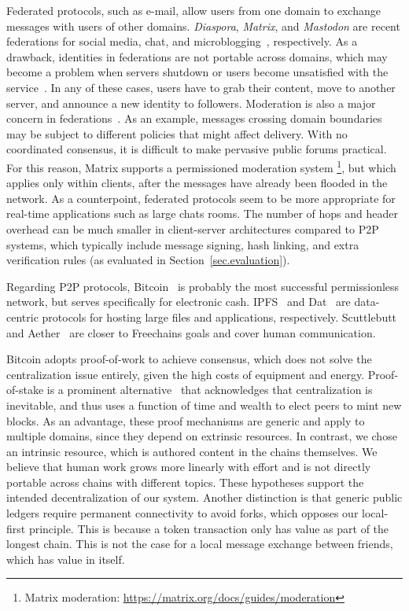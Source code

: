 \documentclass[12pt]{article}
\newcommand{\FC}       {Freechains\xspace}
\begin{document}
Federated protocols, such as e-mail, allow users from one domain to exchange
messages with users of other domains.
\emph{Diaspora}, \emph{Matrix}, and \emph{Mastodon} are recent federations for
social media, chat, and microblogging~\cite{p2p.ecosystem}, respectively.
%
As a drawback, identities in federations are not portable across domains, which
may become a problem when servers shutdown or users become unsatisfied with the
service~\cite{fed.distributed}.
In any of these cases, users have to grab their content, move to another
server, and announce a new identity to followers.
%
Moderation is also a major concern in federations~\cite{p2p.ecosystem}.
As an example, messages crossing domain boundaries may be subject to different
policies that might affect delivery.
With no coordinated consensus, it is difficult to make pervasive public forums
practical.
%
For this reason, Matrix supports a permissioned moderation system%
\footnote{Matrix moderation: \url{https://matrix.org/docs/guides/moderation}},
but which applies only within clients, after the messages have already been
flooded in the network.
%
As a counterpoint, federated protocols seem to be more appropriate for
real-time applications such as large chats rooms.
The number of hops and header overhead can be much smaller in client-server
architectures compared to P2P systems, which typically include message signing,
hash linking, and extra verification rules (as evaluated in
Section~\ref{sec.evaluation}).


Regarding P2P protocols, Bitcoin~\cite{p2p.bitcoin} is probably the most
successful permissionless network, but serves specifically for electronic
cash.
IPFS~\cite{p2p.ipfs} and Dat~\cite{p2p.dat} are data-centric protocols for
hosting large files and applications, respectively.
Scuttlebutt~\cite{p2p.scuttlebutt} and Aether~\cite{p2p.ecosystem} are closer
to \FC goals and cover human communication.

Bitcoin adopts proof-of-work to achieve consensus, which does not solve the
centralization issue entirely, given the high costs of equipment and energy.
Proof-of-stake is a prominent alternative~\cite{p2p.proofs} that acknowledges
that centralization is inevitable, and thus uses a function of time and wealth
to elect peers to mint new blocks.
As an advantage, these proof mechanisms are generic and apply to multiple
domains, since they depend on extrinsic resources.
In contrast, we chose an intrinsic resource, which is authored content in the
chains themselves.
We believe that human work grows more linearly with effort and is not directly
portable across chains with different topics.
These hypotheses support the intended decentralization of our system.
%
Another distinction is that generic public ledgers require permanent
connectivity to avoid forks, which opposes our local-first principle.
This is because a token transaction only has value as part of the longest
chain.
This is not the case for a local message exchange between friends, which has
value in itself.
\end{document}
